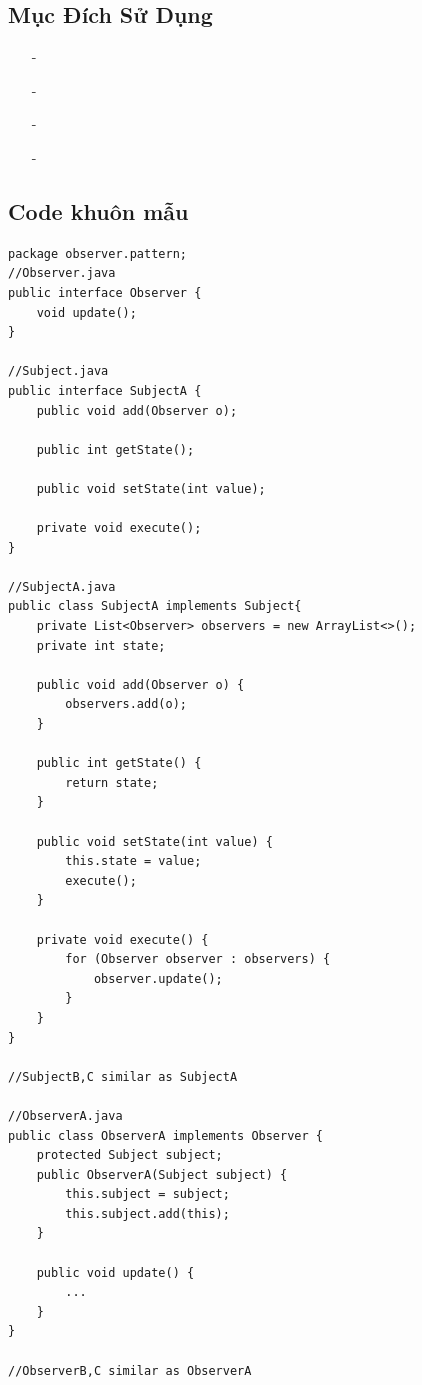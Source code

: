 \documentclass{article}
\newcommand\subpara{\fontsize{13}{13}\selectfont \fontseries{b}\selectfont}
\begin{document}
    \subsection{Mục Đích Sử Dụng}
    \begin{itemize}
        \item[-]\subpara{Thường được sử dụng trong mối quan hệ một - nhiều giữa các object với nhau. Trong đó, một đối tượng thay đổi và muốn thông báo cho tất cả các object liên quan biết về sự thay đổi đó.}
        \item[-]\subpara{Sử dụng trong ứng dụng broadcast - type communication}
        \item[-]\subpara{Sử dụng để quản lý sự kiện (Event management)}
        \item[-]\subpara{Sử dụng trong mẫu mô hình MVC (Model View Controller Pattern)}
    \end{itemize}

    \subsection{Code khuôn mẫu}
    \begin{lstlisting}
package observer.pattern;
//Observer.java
public interface Observer {
    void update();
}

//Subject.java
public interface SubjectA {
    public void add(Observer o);

    public int getState();

    public void setState(int value);

    private void execute();
}

//SubjectA.java
public class SubjectA implements Subject{
    private List<Observer> observers = new ArrayList<>();
    private int state;

    public void add(Observer o) {
        observers.add(o);
    }

    public int getState() {
        return state;
    }

    public void setState(int value) {
        this.state = value;
        execute();
    }

    private void execute() {
        for (Observer observer : observers) {
            observer.update();
        }
    }
}

//SubjectB,C similar as SubjectA

//ObserverA.java
public class ObserverA implements Observer {
    protected Subject subject;
    public ObserverA(Subject subject) {
        this.subject = subject;
        this.subject.add(this);
    }

    public void update() {
        ...
    }
}

//ObserverB,C similar as ObserverA

    \end{lstlisting}
\end{document}
